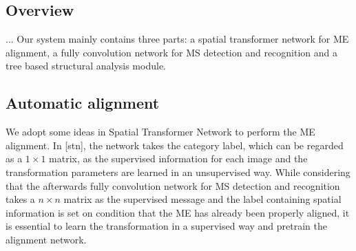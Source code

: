 \documentclass[10pt,conference,a4paper]{IEEEtran}
\begin{document}
	\subsection{Overview}
	...
	Our system mainly contains three parts: a spatial transformer network for ME alignment, a fully convolution network for MS detection and recognition and a tree based structural analysis module.
	\subsection{Automatic alignment}
	We adopt some ideas in Spatial Transformer Network to perform the ME alignment. In [stn], the network takes the category label, which can be regarded as a $1 \times 1$ matrix, as the supervised information for each image and the transformation parameters are learned in an unsupervised way. While considering that the afterwards fully convolution network for MS detection and recognition takes a $n \times n$ matrix as the supervised message and the label containing spatial information is set on condition that the ME has already been properly aligned, it is essential to learn the transformation in a supervised way and pretrain the alignment network.
	
\end{document}
